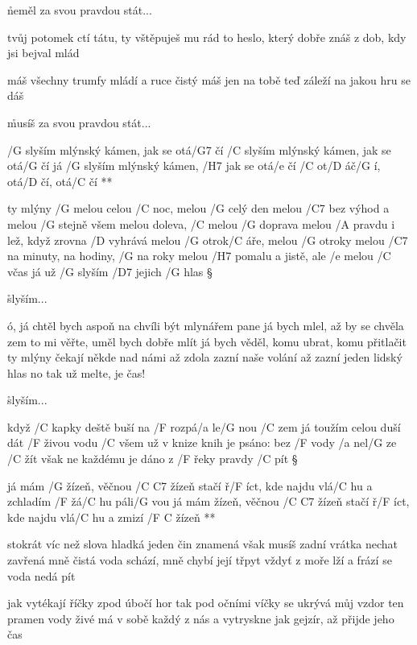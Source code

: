 \r neměl za svou pravdou stát...

tvůj potomek ctí tátu, ty vštěpuješ mu rád
to heslo, který dobře znáš z dob, kdy jsi bejval mlád \s

máš všechny trumfy mládí a ruce čistý máš
jen na tobě teď záleží na jakou hru se dáš \s

\r musíš za svou pravdou stát...




\R /G slyším mlýnský kámen, jak se otá/G7 čí
   /C slyším mlýnský kámen, jak se otá/G čí
   já /G slyším mlýnský kámen, /H7 jak se otá/e čí
   /C ot/D áč/G í, otá/D čí, otá/C čí **

ty mlýny /G melou celou /C noc, melou /G celý den
melou /C7 bez výhod a melou /G stejně všem
melou doleva, /C melou /G doprava
melou /A pravdu i lež, když zrovna /D vyhrává
melou /G otrok/C áře, melou /G otroky
melou /C7 na minuty, na hodiny, /G na roky
melou /H7 pomalu a jistě, ale /e melou /C včas
já už /G slyším /D7 jejich /G hlas \S

\r slyším...

ó, já chtěl bych aspoň na chvíli být mlynářem
pane já bych mlel, až by se chvěla zem
to mi věřte, uměl bych dobře mlít
já bych věděl, komu ubrat, komu přitlačit
ty mlýny čekají někde nad námi
až zdola zazní naše volání
až zazní jeden lidský hlas
no tak už melte, je čas! \s

\r slyším...




když /C kapky deště buší na /F rozpá/a le/G nou /C zem
já toužím celou duší dát /F živou vodu /C všem
už v knize knih je psáno: bez /F vody /a nel/G ze /C žít
však ne každému je dáno z /F řeky pravdy /C pít \S

\R já mám /G žízeň, věčnou /{C C7} žízeň
   stačí ř/F íct, kde najdu vlá/C hu a zchladím /F žá/C hu páli/G vou
   já mám žízeň, věčnou /{C C7} žízeň
   stačí ř/F íct, kde najdu vlá/C hu a zmizí /{F C} žízeň **

stokrát víc než slova hladká jeden čin znamená
však musíš zadní vrátka nechat zavřená
mně čistá voda schází, mně chybí její třpyt
vždyť z moře lží a frází se voda nedá pít \s

jak vytékají říčky zpod úbočí hor
tak pod očními víčky se ukrývá můj vzdor
ten pramen vody živé má v sobě každý z nás
a vytryskne jak gejzír, až přijde jeho čas



